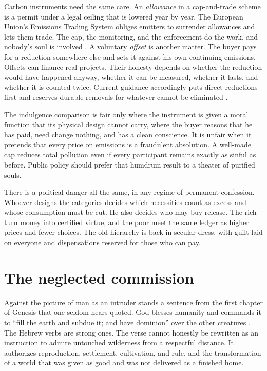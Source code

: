 \documentclass[12pt,a4paper]{book}
\begin{document}
Carbon instruments need the same care. An \emph{allowance} in a cap-and-trade scheme is a permit under a legal ceiling that is lowered year by year. The European Union's Emissions Trading System obliges emitters to surrender allowances and lets them trade. The cap, the monitoring, and the enforcement do the work, and nobody's soul is involved \cite{EUETS}. A voluntary \emph{offset} is another matter. The buyer pays for a reduction somewhere else and sets it against his own continuing emissions. Offsets can finance real projects. Their honesty depends on whether the reduction would have happened anyway, whether it can be measured, whether it lasts, and whether it is counted twice. Current guidance accordingly puts direct reductions first and reserves durable removals for whatever cannot be eliminated \cite{OxfordOffsettingPrinciples2024}.

The indulgence comparison is fair only where the instrument is given a moral function that its physical design cannot carry, where the buyer reasons that he has paid, need change nothing, and has a clean conscience. It is unfair when it pretends that every price on emissions is a fraudulent absolution. A well-made cap reduces total pollution even if every participant remains exactly as sinful as before. Public policy should prefer that humdrum result to a theater of purified souls.

There is a political danger all the same, in any regime of permanent confession. Whoever designs the categories decides which necessities count as excess and whose consumption must be cut. He also decides who may buy release. The rich turn money into certified virtue, and the poor meet the same ledger as higher prices and fewer choices. The old hierarchy is back in secular dress, with guilt laid on everyone and dispensations reserved for those who can pay.

\section{The neglected commission}

Against the picture of man as an intruder stands a sentence from the first chapter of Genesis that one seldom hears quoted. God blesses humanity and commands it to ``fill the earth and subdue it; and have dominion'' over the other creatures \cite[Gen.~1:28]{NRSVue2021}. The Hebrew verbs are strong ones. The verse cannot honestly be rewritten as an instruction to admire untouched wilderness from a respectful distance. It authorizes reproduction, settlement, cultivation, and rule, and the transformation of a world that was given as good and was not delivered as a finished home.
\end{document}
